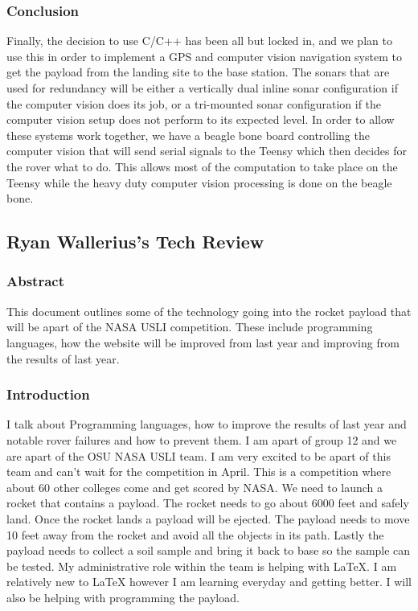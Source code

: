 \documentclass[onecolumn, draftclsnofoot, 10pt, compsoc]{IEEEtran}
\begin{document}
\subsubsection{Conclusion}
Finally, the decision to use C/C++ has been all but locked in, and we plan to use this in order to implement a GPS and computer vision navigation system to get the payload from the landing site to the base station. The sonars that are used for redundancy will be either a vertically dual inline sonar configuration if the computer vision does its job, or a tri-mounted sonar configuration if the computer vision setup does not perform to its expected level. In order to allow these systems work together, we have a beagle bone board controlling the computer vision that will send serial signals to the Teensy which then decides for the rover what to do. This allows most of the computation to take place on the Teensy while the heavy duty computer vision processing is done on the beagle bone. 


\subsection{Ryan Wallerius's Tech Review}
\subsubsection{Abstract}
This document outlines some of the technology going into the rocket payload that will be apart of the NASA USLI competition. These include programming languages, how the website will be improved from last year and improving from the results of last year. 

\subsubsection{Introduction}
I talk about Programming languages, how to improve the results of last year and notable rover failures and how to prevent them. I am apart of group 12 and we are apart of the OSU NASA USLI team. I am very excited to be apart of this team and can't wait for the competition in April. This is a competition where about 60 other colleges come and get scored by NASA. We need to launch a rocket that contains a payload. The rocket needs to go about 6000 feet and safely land. Once the rocket lands a payload will be ejected. The payload needs to move 10 feet away from the rocket and avoid all the objects in its path. Lastly the payload needs to collect a soil sample and bring it back to base so the sample can be tested. My administrative role within the team is helping with LaTeX. I am relatively new to LaTeX however I am learning everyday and getting better. I will also be helping with programming the payload.
\end{document}
